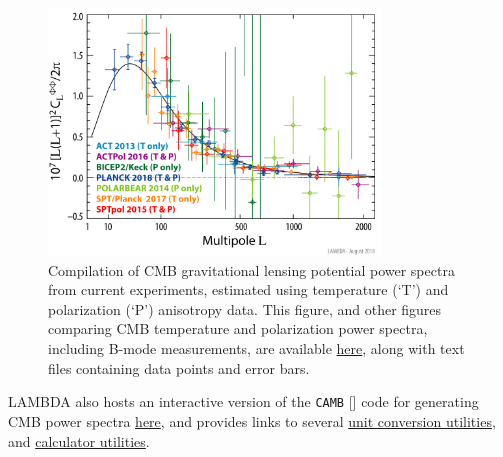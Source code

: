 \documentclass[letter]{emulateapj}
\begin{document}
\begin{figure}[t!]
    \centering
    \includegraphics[width=3.464in]{fig_1}
    \caption{Compilation of CMB gravitational lensing potential power spectra from current experiments, estimated using temperature (`T') and polarization (`P') anisotropy data. This figure, and other figures comparing CMB temperature and polarization power spectra, including B-mode measurements, are available \href{https://lambda.gsfc.nasa.gov/graphics/}{here}, along with text files containing data points and error bars.}
    \label{fig:bandpower}
\end{figure}

LAMBDA also hosts an interactive version of the \texttt{CAMB} [] code for generating CMB power spectra  \href{https://lambda.gsfc.nasa.gov/toolbox/tb_camb_form.cfm}{here}, and provides links to several  \href{https://lambda.gsfc.nasa.gov/toolbox/tb_converters_ov.cfm}{unit conversion utilities}, and  \href{https://lambda.gsfc.nasa.gov/toolbox/tb_calclinks.cfm}{calculator utilities}.
\end{document}
